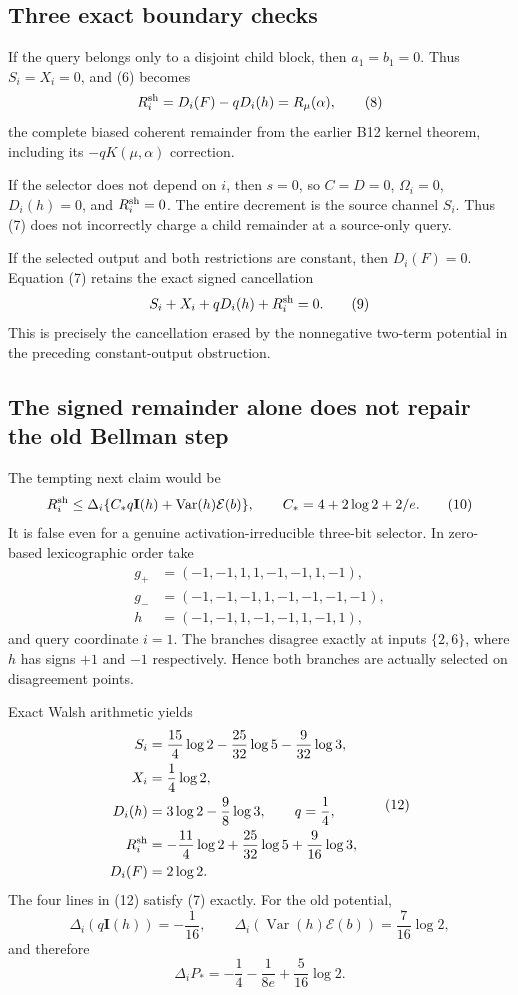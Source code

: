 \subsection*{Three exact boundary checks}

If the query belongs only to a disjoint child block, then $a_1=b_1=0$.
Thus $S_i=X_i=0$, and (6) becomes
\[
 R_i^{\rm sh}=D_i(F)-qD_i(h)=R_\mu(\alpha),                  \tag{8}
\]
the complete biased coherent remainder from the earlier B12 kernel theorem,
including its $-qK(\mu,\alpha)$ correction.

If the selector does not depend on $i$, then $s=0$, so $C=D=0$,
$\Omega_i=0$, $D_i(h)=0$, and $R_i^{\rm sh}=0$.  The entire decrement is
the source channel $S_i$.  Thus (7) does not incorrectly charge a child
remainder at a source-only query.

If the selected output and both restrictions are constant, then
$D_i(F)=0$.  Equation (7) retains the exact signed cancellation
\[
 S_i+X_i+qD_i(h)+R_i^{\rm sh}=0.                              \tag{9}
\]
This is precisely the cancellation erased by the nonnegative two-term
potential in the preceding constant-output obstruction.

\subsection*{The signed remainder alone does not repair the old Bellman step}

The tempting next claim would be
\[
 R_i^{\rm sh}\le
 \Delta_i\{C_*q\mathbf I(h)+\operatorname{Var}(h)
                    \mathcal E(b)\},
 \qquad C_*=4+2\log2+2/e.                                    \tag{10}
\]
It is false even for a genuine activation-irreducible three-bit selector.
In zero-based lexicographic order take
\[
\begin{split}
g_+&=(-1,-1,1,1,-1,-1,1,-1),\\
g_-&=(-1,-1,-1,1,-1,-1,-1,-1),\\
h&=(-1,-1,1,-1,-1,1,-1,1),
\end{split}                                                   \tag{11}
\]
and query coordinate $i=1$.  The branches disagree exactly at inputs
$\{2,6\}$, where $h$ has signs $+1$ and $-1$ respectively.  Hence both
branches are actually selected on disagreement points.

Exact Walsh arithmetic yields
\[
\begin{aligned}
S_i&=\frac{15}{4}\log2-\frac{25}{32}\log5-\frac9{32}\log3,\\
X_i&=\frac14\log2,\\
D_i(h)&=3\log2-\frac98\log3,\qquad q=\frac14,\\
R_i^{\rm sh}&=-\frac{11}{4}\log2+\frac{25}{32}\log5
                         +\frac9{16}\log3,\\
D_i(F)&=2\log2.
\end{aligned}                                                 \tag{12}
\]
The four lines in (12) satisfy (7) exactly.  For the old potential,
\[
 \Delta_i(q\mathbf I(h))=-\frac1{16},\qquad
 \Delta_i(\operatorname{Var}(h)\mathcal E(b))=\frac7{16}\log2,
\tag{13}
\]
and therefore
\[
 \Delta_iP_*=-\frac14-\frac1{8e}+\frac5{16}\log2.            \tag{14}
\]

